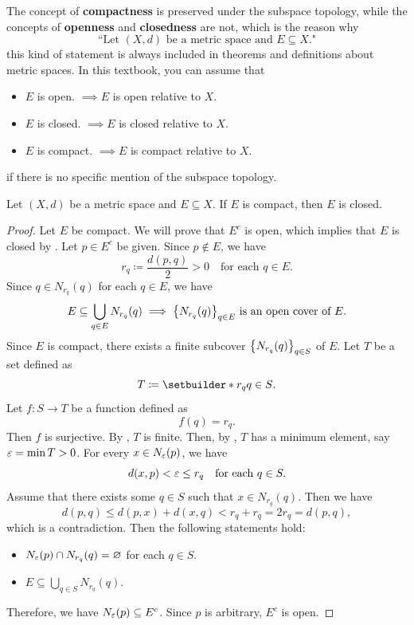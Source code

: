 \begin{remark}
    The concept of \textbf{compactness} is preserved under the subspace topology, while
    the concepts of \textbf{openness} and \textbf{closedness} are not, which is the reason why
    \[
    \text{``Let $(X, d)$ be a metric space and $E \subseteq X$."}
    \]
    this kind of statement is always included in theorems and definitions about metric spaces.
    In this textbook, you can assume that
    \begin{itemize}
        \item $E$ is open. $\implies E$ is open relative to $X$.
        \item $E$ is closed. $\implies E$ is closed relative to $X$.
        \item $E$ is compact. $\implies E$ is compact relative to $X$.
    \end{itemize}
    if there is no specific mention of the subspace topology.
\end{remark}

\bigskip

\begin{theorem} \label{an:thm:compact-set-is-closed}
    Let $(X, d)$ be a metric space and $E \subseteq X$. If $E$ is compact, then $E$ is closed.
\end{theorem}

\begin{proof}
    Let $E$ be compact. We will prove that $E^{c}$ is open, which implies that $E$ is closed
    by . Let $p \in E^{c}$ be given. Since $p \notin E$, we have
    \[
    r_{q} \coloneqq \frac{d(p, q)}{2} > 0 \quad \text{for each } q \in E.
    \]
    Since $q \in N_{r_{q}}(q)$ for each $q \in E$, we have
    \[
    E \subseteq  \bigcup_{q \in E} N_{r_{q}}(q) \implies
    \set*{N_{r_{q}}(q)}_{q \in E} \text{ is an open cover of } E.
    \]
    Since $E$ is compact, there exists a finite subcover $\set*{N_{r_{q}}(q)}_{q \in S}$ of $E$.
    Let $T$ be a set defined as
    \[
    T \coloneqq \setbuilder*{r_{q}}{q \in S}.
    \]
    Let $f: S \to T$ be a function defined as
    \[
    f(q) = r_{q}.
    \]
    Then $f$ is surjective. By , $T$ is finite. Then, by
    , $T$ has a minimum element, say $\veps = \min T > 0$.
    For every $x \in N_{\veps}(p)$, we have
    \[
    d(x, p) < \veps \leq r_{q} \quad \text{for each } q \in S.
    \]
    Assume that there exists some $q \in S$ such that $x \in N_{r_{q}}(q)$. Then we have
    \[
    d(p, q) \leq d(p, x) + d(x, q) < r_{q} + r_{q} = 2r_{q} = d(p, q),
    \]
    which is a contradiction. Then the following statements hold:
    \begin{itemize}
        \item $N_{\veps}(p) \cap N_{r_{q}}(q) = \vnot$ for each $q \in S$.
        \item $E \subseteq \bigcup_{q \in S} N_{r_{q}}(q)$.
    \end{itemize}
    Therefore, we have $N_{\veps}(p) \subseteq E^{c}$. Since $p$ is arbitrary, $E^{c}$ is open.
\end{proof}

